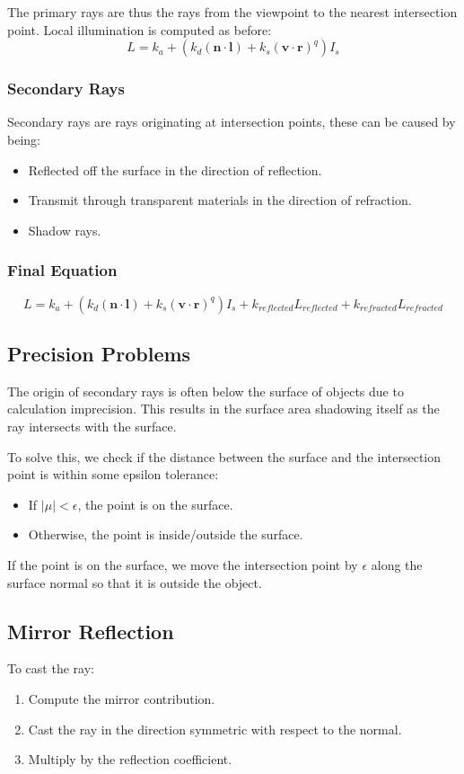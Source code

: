 \documentclass[11pt]{article}
\begin{document}
The primary rays are thus the rays from the viewpoint to the nearest intersection point.
Local illumination is computed as before:
\[
  L = k_a + (k_d (\bm{n} \cdot \bm{l}) + k_s(\bm{v} \cdot \bm{r})^q)I_s 
\]

\subsubsection{Secondary Rays}
Secondary rays are rays originating at intersection points, these can be caused by being:
\begin{itemize}
  \item Reflected off the surface in the direction of reflection.
  \item Transmit through transparent materials in the direction of refraction.
  \item Shadow rays.
\end{itemize}

\subsubsection{Final Equation}
\[
  L = k_a + (k_d (\bm{n} \cdot \bm{l}) + k_s(\bm{v} \cdot \bm{r})^q)I_s + k_{reflected} L_{reflected} + k_{refracted}L_{refracted}
\]

\subsection{Precision Problems}
\label{sec:epsilon}
The origin of secondary rays is often below the surface of objects due to calculation imprecision.
This results in the surface area shadowing itself as the ray intersects with the surface.

To solve this, we check if the distance between the surface and the intersection point is within some epsilon tolerance:
\begin{itemize}
  \item If $ \lvert \mu \rvert < \epsilon$, the point is on the surface.
  \item Otherwise, the point is inside/outside the surface.
\end{itemize}

If the point is on the surface, we move the intersection point by $\epsilon$ along the surface normal so that it is outside the object.

\subsection{Mirror Reflection}
To cast the ray:
\begin{enumerate}
  \item Compute the mirror contribution.
  \item Cast the ray in the direction symmetric with respect to the normal.
  \item Multiply by the reflection coefficient.
\end{enumerate}
\end{document}
